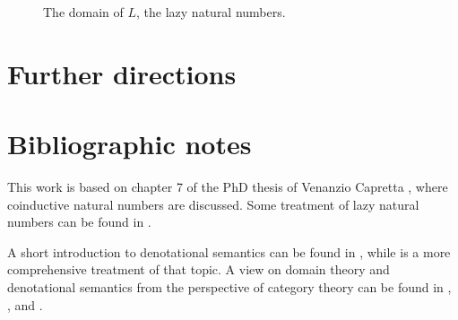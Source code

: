 \documentclass[a4paper]{article}
\begin{document}
\begin{figure}
\begin{center}
\end{center}
\caption{The domain of $L$, the lazy natural numbers.}
\label{figDomainOfLazyNaturals}
\end{figure}


\section{Further directions}

\section{Bibliographic notes}

This work is based on chapter 7 of the PhD thesis of Venanzio Capretta
\cite{Capretta2002}, where coinductive natural numbers are discussed.  Some
treatment of lazy natural numbers can be found in \cite{Escardo1993}.

A short introduction to denotational semantics can be found in
\cite{Allison1986}, while \cite{Gunter1992} is a more comprehensive treatment of
that topic.  A view on domain theory and denotational semantics from the
perspective of category theory can be found in \cite{Pierce1991},
\cite{Bird1997}, \cite{Mitchell1996} and \cite{BarrWells1990}.




\end{document}
